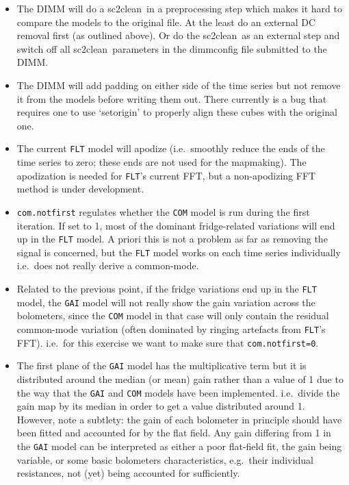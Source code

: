 \documentclass[twoside,11pt]{article}
\newcommand{\xref}[3]{#1}
\renewcommand{\_}{\texttt{\symbol{95}}}
\newcommand{\task}[1]{\textsf{#1}}
\newcommand{\param}[1]{\texttt{#1}}
\newcommand{\clean}{\xref{\task{sc2clean}}{sun258}{SC2CLEAN}}
\begin{document}
\begin{itemize}
\item The DIMM will do a \clean\ in a preprocessing step
  which makes it hard to compare the models to the original file. At
  the least do an external DC removal first (as outlined above).  Or
  do the \clean\ as an external step and switch off all \clean\
  parameters in the dimmconfig file submitted to the DIMM.

\item The DIMM will add padding on either side of the time series but
  not remove it from the models before writing them out. There
  currently is a bug that requires one to use `setorigin' to properly
  align these cubes with the original one.

\item The current \texttt{FLT} model will apodize (i.e.\ smoothly
  reduce the ends of the time series to zero; these ends are not used
  for the mapmaking). The apodization is needed for \texttt{FLT}'s
  current FFT, but a non-apodizing FFT method is under development.

\item \param{com.notfirst} regulates whether the \texttt{COM} model is
  run during the first iteration. If set to 1, most of the dominant
  fridge-related variations will end up in the \texttt{FLT} model. A
  priori this is not a problem as far as removing the signal is
  concerned, but the \texttt{FLT} model works on each time series
  individually i.e.\ does not really derive a common-mode.

\item Related to the previous point, if the fridge variations end up
  in the \texttt{FLT} model, the \texttt{GAI} model will not really
  show the gain variation across the bolometers, since the
  \texttt{COM} model in that case will only contain the residual
  common-mode variation (often dominated by ringing artefacts from
  \texttt{FLT}'s FFT). i.e.\ for this exercise we want to make sure
  that \texttt{com.notfirst=0}.

\item The first plane of the \texttt{GAI} model has the multiplicative
  term but it is distributed around the median (or mean) gain rather
  than a value of 1 due to the way that the \texttt{GAI} and
  \texttt{COM} models have been implemented. i.e.\ divide the gain map
  by its median in order to get a value distributed around 1. However,
  note a subtlety: the gain of each bolometer in principle should have
  been fitted and accounted for by the flat field.  Any gain differing
  from 1 in the \texttt{GAI} model can be interpreted as either a poor
  flat-field fit, the gain being variable, or some basic bolometers
  characteristics, e.g.\ their individual resistances, not (yet) being
  accounted for sufficiently.
\end{itemize}
\end{document}
